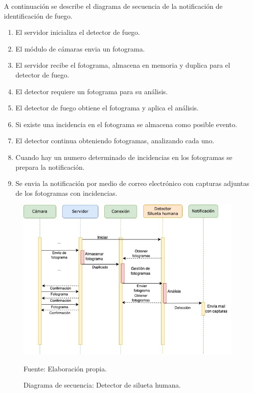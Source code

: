 A continuación se describe el diagrama de secuencia de la notificación de identificación de fuego.\\
\begin{enumerate}
    \item El servidor inicializa el detector de fuego.
    \item El módulo de cámaras envia un fotograma.    
    \item El servidor recibe el fotograma, almacena en memoria y duplica para el detector de fuego.
    \item El detector requiere un fotograma para su análisis.
    \item El detector de fuego obtiene el fotograma y aplica el análisis.
    \item Si existe una incidencia en el fotograma se almacena como posible evento. 
    \item El detector continua obteniendo fotogramas, analizando cada uno.
    \item Cuando hay un numero determinado de incidencias en los fotogramas se prepara la notificación.
    \item Se envia la notificación por medio de correo electrónico con capturas adjuntas de los fotogramas con incidencias.
\end{enumerate}


\begin{figure}[H]
    \begin{center}
        \includegraphics[width=15cm]{img/capitulo_4/human_detection.jpg}
    \end{center}
    \begin{center}
        \caption{Diagrama de secuencia: Detector de silueta humana.}
        Fuente: Elaboración propia.
        \label{fig:diag_sec_dec_human}
    \end{center}
\end{figure}

